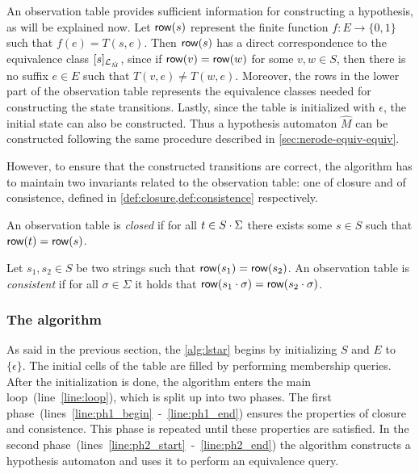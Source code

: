 An observation table provides sufficient information for constructing a
hypothesis, as will be explained now. Let $\mathsf{row}(s)$ represent the finite
function $f : E \rightarrow \{0,1\}$ such that $f(e) = T(s,e)$. Then $\mathsf{row}(s)$
has a direct correspondence to the equivalence class $[s]_{\mathcal{L}_{\hat M}}$,
since if $\mathsf{row}(v) = \mathsf{row}(w)$ for some $v,w \in S$, then there is no suffix
$e \in E$ such that $T(v,e) \neq T(w,e)$. Moreover, the rows in the lower part
of the observation table represents the equivalence classes needed for
constructing the state transitions. Lastly, since the table is initialized with
$\epsilon$, the initial state can also be constructed. Thus a hypothesis
automaton $\hat M$ can be constructed following the same procedure described in
\cref{sec:nerode-equiv-equiv}.

However, to ensure that the constructed transitions are correct, the algorithm
has to maintain two invariants related to the observation table: one of closure
and of consistence, defined in \cref{def:closure,def:consistence} respectively.

\begin{definition}[Closure]\label{def:closure}
  An observation table is \textit{closed} if for all $t \in S\cdot \Sigma$
  there exists some $s \in S$ such that $\mathsf{row}(t) = \mathsf{row}(s)$.
\end{definition}
\begin{definition}[Consistence]\label{def:consistence}
  Let $s_1, s_2 \in S$ be two strings such that $\mathsf{row}(s_1) = \mathsf{row}(s_2)$. An
  observation table is \textit{consistent} if for all $\sigma \in \Sigma$ it
  holds that $\mathsf{row}(s_1\cdot\sigma) = \mathsf{row}(s_2\cdot\sigma)$.
\end{definition}

\subsubsection{The algorithm}
\label{sec:algorithm}
As said in the previous section, the \cref{alg:lstar} begins by initializing
$S$ and $E$ to $\{\epsilon\}$. The initial cells of the table are filled by
performing membership queries. After the initialization is done, the algorithm
enters the main loop~(line~\ref{line:loop}), which is split up into two
phases. The first phase~(lines~\ref{line:ph1_begin}~-~\ref{line:ph1_end})
ensures the properties of closure and consistence. This phase is repeated
until these properties are satisfied. In the second
phase~(lines~\ref{line:ph2_start}~-~\ref{line:ph2_end}) the algorithm
constructs a hypothesis automaton and uses it to perform an equivalence query.

